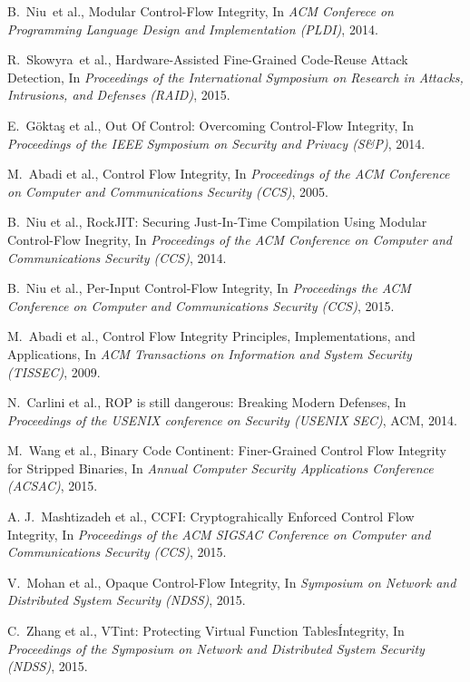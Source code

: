 \documentclass[11pt,a4paper,bibtotoc,idxtotoc,headsepline,footsepline,footexclude,BCOR12mm,DIV13]{scrbook}
\begin{document}
\begin{thebibliography}{50}
B.~Niu~et al., {Modular Control-Flow Integrity}, In
\emph{ACM Conferece on Programming Language Design and Implementation (PLDI)}, 2014.

R.~Skowyra~et al., {Hardware-Assisted Fine-Grained Code-Reuse Attack Detection}, In
\emph{Proceedings of the International Symposium on Research in Attacks, Intrusions, and Defenses (RAID)}, 2015.

E.~G\"{o}kta\c{s} et al., {Out Of Control: Overcoming Control-Flow Integrity}, In
\emph{Proceedings of the IEEE Symposium on Security and Privacy (S\&P)}, 2014.

M.~Abadi et al., {Control Flow Integrity}, In
\emph{Proceedings of the ACM Conference on Computer and Communications Security (CCS)}, 2005.

B.~Niu et al., {RockJIT: Securing Just-In-Time Compilation Using Modular Control-Flow Inegrity}, In
\emph{Proceedings of the ACM Conference on Computer and Communications Security (CCS)}, 2014.

B.~Niu et al., {Per-Input Control-Flow Integrity}, In
\emph{Proceedings the ACM Conference on Computer and Communications Security (CCS)}, 2015.

M.~Abadi et al., {Control Flow Integrity Principles, Implementations, and Applications}, In
\emph{ACM Transactions on Information and System Security (TISSEC)}, 2009.

N.~Carlini et al., {ROP is still dangerous: Breaking Modern Defenses}, In
\emph{Proceedings of the USENIX conference on Security (USENIX SEC)}, ACM, 2014.

M.~Wang et al., {Binary Code Continent: Finer-Grained Control Flow Integrity for Stripped Binaries}, In
\emph{Annual Computer Security Applications Conference (ACSAC)}, 2015.

A. J.~Mashtizadeh et al., {CCFI: Cryptograhically Enforced Control Flow Integrity}, In
\emph{Proceedings of the ACM SIGSAC Conference on Computer and Communications Security (CCS)}, 2015.

V.~Mohan et al., {Opaque Control-Flow Integrity}, In
\emph{Symposium on Network and Distributed System Security (NDSS)}, 2015.

C.~Zhang et al., {VTint: Protecting Virtual Function Tables\' Integrity}, In
\emph{Proceedings of the Symposium on Network and Distributed System Security (NDSS)}, 2015.


\end{thebibliography}
\end{document}
